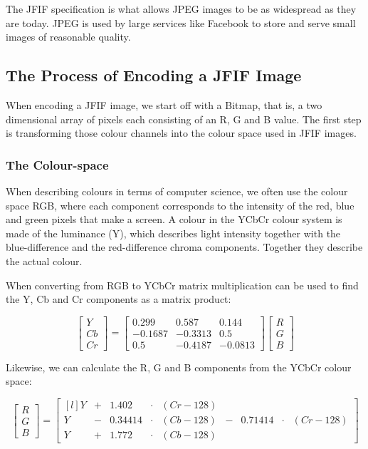 \begin{infobox}
The JFIF specification is what allows JPEG images to be as widespread as they are today.
JPEG is used by large services like Facebook to store and serve small images of reasonable quality.

\vspace{4mm}
\subsection*{The Process of Encoding a JFIF Image}
\vspace{-2.5mm}
When encoding a JFIF image, we start off with a Bitmap, that is, a two dimensional array of pixels each consisting of an R, G and B value. The first step is transforming those colour channels into the colour space used in JFIF images. 

\vspace{4mm}
\subsubsection*{The Colour-space}
\vspace{-2.5mm}
When describing colours in terms of computer science, we often use the colour space RGB, where each component corresponds to the intensity of the red, blue and green pixels that make a screen. 
A colour in the YCbCr colour system is made of the luminance (Y), which describes light intensity together with the blue-difference and the red-difference chroma components.
Together they describe the actual colour.

When converting from RGB to YCbCr matrix multiplication can be used to find the Y, Cb and Cr components as a matrix product:

$$\begin{bmatrix}
	Y\\Cb\\Cr
\end{bmatrix} = \begin{bmatrix}
	0.299 & 0.587 & 0.144\\
	-0.1687 & -0.3313 & 0.5\\
	0.5 & -0.4187 & -0.0813
\end{bmatrix}\begin{bmatrix}
	R\\G\\B
\end{bmatrix}$$

Likewise, we can calculate the R, G and B components from the YCbCr colour space:

$$\begin{bmatrix}
	R\\G\\B
\end{bmatrix} = \begin{bmatrix*}[l]
	Y&+&1.402 &\cdot & (Cr-128)&\\
	Y &-& 0.34414&\cdot &(Cb-128) &- &0.71414&\cdot&(Cr-128)\\
	Y &+& 1.772&\cdot& (Cb-128)&
\end{bmatrix*}$$


\end{infobox}
